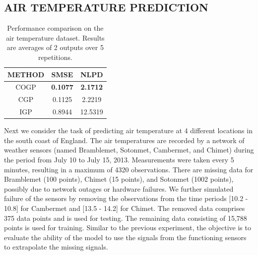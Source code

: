 \subsection{AIR TEMPERATURE PREDICTION}
%
\setlength{\tabcolsep}{4pt}
\begin{table}[t]
\caption{Performance comparison on the air temperature dataset. Results are averages of 2 outputs over 5 repetitions. }
\label{tab:air}
\begin{center}
\begin{tabular}{ccc}
\toprule
\textbf{METHOD} & \textbf{SMSE} & \textbf{NLPD} \\
\hline
COGP & \textbf{0.1077} & \textbf{2.1712} \\
CGP & 0.1125 & 2.2219 \\
IGP & 0.8944 & 12.5319 \\
\bottomrule
\end{tabular}
\end{center}
\end{table}
%
Next we consider the task of predicting air temperature at 4 different locations in the south coast of England. 
The air temperatures are recorded by a network of weather sensors (named Bramblemet, Sotonmet, Cambermet, and Chimet) during the period from July 10 to July 15, 2013.
Measurements were taken every 5 minutes, resulting in a maximum of 4320 observations.
There are missing data for Bramblemet (100 points), Chimet (15 points), and Sotonmet (1002 points), possibly due to network outages or hardware failures.
We further simulated failure of the sensors by removing the observations from the time periods [10.2 - 10.8] for Cambermet and [13.5 - 14.2] for Chimet.
The removed data comprises 375 data points and  is used for testing. 
The remaining data consisting of 15,788 points is used for training.
Similar to the previous experiment, the objective is to evaluate the ability of the model to use the signals from the functioning sensors to extrapolate the missing signals.

